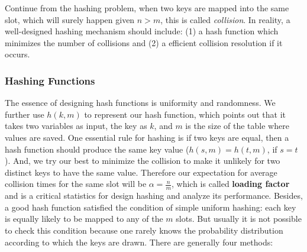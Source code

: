 \documentclass[../main.tex]{subfiles}
\begin{document}
Continue from the hashing problem, when two keys are mapped into the same slot, which will surely happen given $n>m$, this is called \textit{collision}. In reality, a well-designed hashing mechanism
should include: (1) a hash function which minimizes the number of collisions
and (2) a efficient collision resolution if it occurs.
\subsubsection{Hashing Functions}
The essence of designing hash functions is uniformity and randomness. We further use $h(k,m)$ to represent our hash function, which points out that it takes two variables as input, the key as $k$, and $m$ is the size of the table where values are saved. One essential rule for hashing is if two keys are equal, then a hash function should produce the same key value ($h(s, m)=h(t, m)$, if $s=t$). And, we try our best to minimize the collision to make it unlikely for two distinct keys to have the same value. Therefore our expectation for average collision times for the same slot will be $\alpha= \frac{n}{m}$, which is called \textbf{loading factor} and is a critical statistics for design hashing and analyze its performance. Besides,
a good hash function satisfied the condition of simple uniform hashing: each key is equally likely to be mapped to any of the $m$ slots. But usually it is not possible to check this condition because one rarely knows the probability distribution according to which the keys are drawn. There are generally four methods: 
\end{document}
